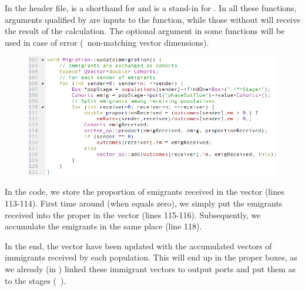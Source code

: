 In the header file,  is a shorthand for  and  is a stand-in for . In all these functions, arguments qualified by  are inputs to the function, while those without will receive the result of the calculation. The optional  argument in some functions will be used in case of error (\ie\ non-matching vector dimensions).

\begin{figure} [ht]
\includegraphics[scale=0.7,left]{graphics/migration-cpp-update-immigration}
\end{figure}

In the code, we store the proportion of emigrants received in the  vector (lines 113-114). First time around (when  equals zero), we simply put the emigrants received into the proper  in the  vector (lines 115-116). Subsequently, we accumulate the emigrants in the same place (line 118).

In the end, the  vector have been updated with the accumulated vectors of immigrants received by each population. This will end up in the proper  boxes, as we already (in ) linked these immigrant vectors to  output ports and put them as  to the stages (\cf\ ).

